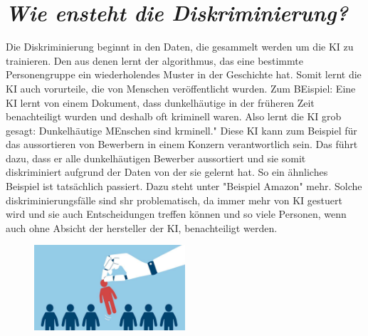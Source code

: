 \documentclass{article}
\begin{document}
\section{\textit{Wie ensteht die Diskriminierung?}}
Die Diskriminierung beginnt in den Daten, die gesammelt werden um die KI zu trainieren. Den aus denen lernt der algorithmus, das eine bestimmte Personengruppe ein wiederholendes Muster in der Geschichte hat. Somit lernt die KI auch vorurteile, die von Menschen veröffentlicht wurden. Zum BEispiel: Eine KI lernt von einem Dokument, dass dunkelhäutige in der früheren Zeit benachteiligt wurden und deshalb oft kriminell waren. Also lernt die KI grob gesagt: Dunkelhäutige MEnschen sind krminell." Diese KI kann zum Beispiel für das aussortieren von Bewerbern in einem Konzern verantwortlich sein. Das führt dazu, dass er alle dunkelhäutigen Bewerber aussortiert und sie somit diskriminiert aufgrund der Daten von der sie gelernt hat. So ein ähnliches Beispiel ist tatsächlich passiert. Dazu steht unter "Beispiel Amazon" mehr. Solche diskriminierungsfälle sind shr problematisch, da immer mehr von KI gestuert wird und sie auch Entscheidungen treffen können und so viele Personen, wenn auch ohne Absicht der hersteller der KI, benachteiligt werden. 

\begin{figure}[ht]
    \centering
    \includegraphics[width=0.5\textwidth]{KI Diskriminierung 2.jpg}
    \caption{}
    \label{fig:Diskriminierung}
\end{figure}
\end{document}
